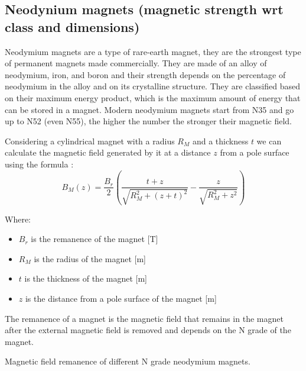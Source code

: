 \subsection{Neodynium magnets (magnetic strength wrt class and dimensions)}
Neodymium magnets are a type of rare-earth magnet, they are the strongest type of permanent magnets made commercially.
They are made of an alloy of neodymium, iron, and boron and their strength depends on the percentage of neodymium in the alloy and on its crystalline structure.
They are classified based on their maximum energy product, which is the maximum amount of energy that can be stored in a magnet. Modern neodymium magnets start from N35 and go up to N52 (even N55), the higher the number the stronger their magnetic field.

Considering a cylindrical magnet with a radius $R_M$ and a thickness $t$ we can calculate the magnetic field generated by it at a distance $z$ from a pole surface using the formula \cite{Magnetic_field_perm_magnet}:
\begin{equation}
    B_M(z) = \frac{B_r}{2} \left( \frac{t+z}{\sqrt{R_M^2+(z+t)^2}} - \frac{z}{\sqrt{R_M^2+z^2}} \right) \label{eq:Magnetic_field_perm_magnet}
\end{equation} 

Where: 
\begin{itemize}
    \item $B_r$ is the remanence of the magnet [T]
    \item $R_M$ is the radius of the magnet [m]
    \item $t$ is the thickness of the magnet [m]
    \item $z$ is the distance from a pole surface of the magnet [m]
\end{itemize}

The remanence of a magnet is the magnetic field that remains in the magnet after the external magnetic field is removed and depends on the N grade of the magnet.

\begin{table}
    \centering
    \resizebox{.6\linewidth}{!}{}
    \caption{Magnetic field remanence of different N grade neodymium magnets.}
    \label{tab: magnet_grades}
\end{table}
